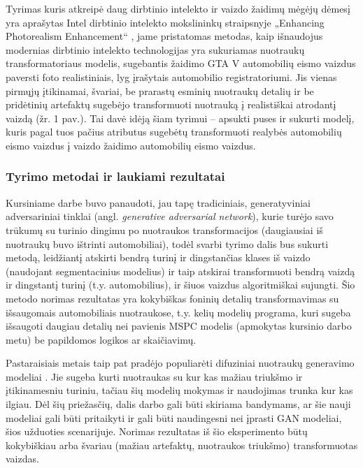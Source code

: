 \documentclass{VUMIFPSbakalaurinis}
\begin{document}
    Tyrimas kuris atkreipė daug dirbtinio intelekto ir vaizdo žaidimų mėgėjų dėmesį yra aprašytas Intel dirbtinio intelekto mokslininkų straipsnyje „Enhancing Photorealism Enhancement“ \cite{EnPhEn}, jame pristatomas metodas, kaip išnaudojus modernias dirbtinio intelekto technologijas yra sukuriamas nuotraukų transformatoriaus modelis, sugebantis žaidimo GTA V automobilių eismo vaizdus paversti foto realistiniais, lyg įrašytais automobilio registratoriumi. Jis vienas pirmųjų įtikinamai, švariai, be prarastų esminių nuotraukų detalių ir be pridėtinių artefaktų sugebėjo transformuoti nuotrauką į realistiškai atrodantį vaizdą (žr. 1 pav.). Tai davė idėją šiam tyrimui – apsukti puses ir sukurti modelį, kuris pagal tuos pačius atributus sugebėtų transformuoti realybės automobilių eismo vaizdus į vaizdo žaidimo automobilių eismo vaizdus.

    \subsubsection*{Tyrimo metodai ir laukiami rezultatai}
        Kursiniame darbe buvo panaudoti, jau tapę tradiciniais, generatyviniai adversariniai tinklai \cite{OrigGan} (angl. \emph{generative adversarial network}), kurie turėjo savo trūkumų su turinio dingimu po nuotraukos transformacijos (daugiausiai iš nuotraukų buvo ištrinti automobiliai), todėl svarbi tyrimo dalis bus sukurti metodą, leidžiantį atskirti bendrą turinį ir dingstančias klases iš vaizdo (naudojant segmentacinius modelius) ir taip atskirai transformuoti bendrą vaizdą ir dingstantį turinį (t.y. automobilius), ir šiuos vaizdus algoritmiškai sujungti. Šio metodo norimas rezultatas yra kokybiškas foninių detalių transformavimas su išsaugomais automobiliais nuotraukose, t.y. kelių modelių programa, kuri sugeba išsaugoti daugiau detalių nei pavienis MSPC modelis \cite{Mspc} (apmokytas kursinio darbo metu) be papildomos logikos ar skaičiavimų.
    
        Pastaraisiais metais taip pat pradėjo populiarėti difuziniai nuotraukų generavimo modeliai \cite{DiffMod}. Jie sugeba kurti nuotraukas su kur kas mažiau triukšmo ir įtikinamesniu turiniu, tačiau šių modelių mokymas ir naudojimas trunka kur kas ilgiau. Dėl šių priežasčių, dalis darbo gali būti skiriama bandymams, ar šie nauji modeliai gali būti pritaikyti ir gali būti naudingesni nei įprasti GAN modeliai, šios užduoties scenarijuje. Norimas rezultatas iš šio eksperimento būtų kokybiškiau arba švariau (mažiau artefaktų, nuotraukos triukšmo) transformuotas vaizdas.
\end{document}

